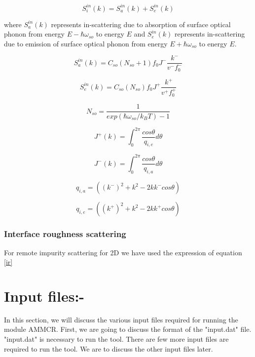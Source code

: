 \documentclass[12pt]{article}
\begin{document}
\begin{equation}
S_i^{in}(k) = S_a^{in}(k) + S_e^{in}(k)
\label{in_sc_so}
\end{equation}

where $S_a^{in}(k)$ represents in-scattering due to absorption of surface optical phonon from energy $E-\hbar \omega_{so}$ to energy $E$ and $S_e^{in}(k)$ represents in-scattering due to emission of surface optical phonon from energy $E+\hbar \omega_{so}$ to energy $E$.
   
\begin{equation}
S_{a}^{in}(k) = C_{so} (N_{so}+1) f_{0}  J^- \frac{k^-}{v ^-f_{0}^-}
\label{ab_in_sc_so}
\end{equation}

\begin{equation}
S_{e}^{in}(k) = C_{so} (N_{so}) f_{0}  J^+\frac{k^+}{v^+ f_{0}^+}
\label{ab_in_sc_so}
\end{equation}


\begin{equation}
N_{so} = \frac{1}{exp(\hbar\omega_{so}/k_B T) - 1}
\label{N_so}
\end{equation}

\begin{equation}
J^{+}(k) = \int_0^{2\pi} \frac{cos \theta}{q_{i,e}}  d\theta 
\label{J_plus_so}
\end{equation}

\begin{equation}
J^{-}(k) = \int_0^{2\pi} \frac{cos \theta}{q_{i,a}} d\theta 
\label{J_minus_so}
\end{equation}

\begin{equation}
q_{i,a} = \left( \left( k^{-}\right)^2 + k^2 - 2k k^{-} cos \theta \right)
\label{q_ab_so}
\end{equation}

\begin{equation}
q_{i,e} = \left( \left( k^{+}\right)^2 + k^2  - 2k k^{+} cos \theta \right)
\label{q_em_so}
\end{equation}

\subsubsection{Interface roughness scattering}
For remote impurity scattering for 2D we have used the expression of equation \ref{ir}


\section{Input files:-} \label{input_files}
In this section, we  will discuss the various input files required for running the module AMMCR. First, we are going to discuss the format of the "input.dat" file. "input.dat" is necessary to run the tool. There are few more input files are required to run the tool. We are to discuss the other input files later. 
\end{document}

